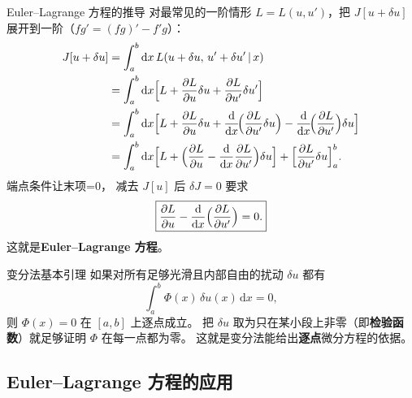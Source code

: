 \documentclass[fontset=windows, chinese, 10pt, xcolor=dvipsnames]{beamer}
\begin{document}
\begin{frame}{Euler--Lagrange 方程的推导}
  对最常见的一阶情形 $L=L(u,u')$，把 $J[u+\delta u]$ 展开到一阶（$fg'=(fg)'-f'g$）：
  \begin{align*}
    J[u+\delta u] &= \int_a^b \mathrm{d}x\, L(u+\delta u,\, u'+\delta u'\,|\,x) \\
    &= \int_a^b \mathrm{d}x \Bigl[L + \frac{\partial L}{\partial u}\delta u
                                  + \frac{\partial L}{\partial u'}\delta u'\Bigr] \\
    &= \int_a^b \mathrm{d}x \Bigl[L + \frac{\partial L}{\partial u}\delta u
       + \frac{\mathrm{d}}{\mathrm{d}x}\!\Bigl(\frac{\partial L}{\partial u'}\delta u\Bigr)
       - \frac{\mathrm{d}}{\mathrm{d}x}\!\Bigl(\frac{\partial L}{\partial u'}\Bigr)\delta u\Bigr] \\
    &= \int_a^b \mathrm{d}x \Bigl[L + \Bigl(\frac{\partial L}{\partial u}
            - \frac{\mathrm{d}}{\mathrm{d}x}\frac{\partial L}{\partial u'}\Bigr)\delta u\Bigr]
       + \Bigl[\frac{\partial L}{\partial u'}\delta u\Bigr]_a^b.
  \end{align*}
  端点条件让末项=0，
  减去 $J[u]$ 后 $\delta J = 0$ 要求
  \begin{equation*}
    \boxed{\frac{\partial L}{\partial u}
    - \frac{\mathrm{d}}{\mathrm{d}x}
      \Bigl(\frac{\partial L}{\partial u'}\Bigr) = 0.}
  \end{equation*}
  这就是\textbf{Euler--Lagrange 方程}。
\end{frame}

\begin{frame}{变分法基本引理}
  如果对所有足够光滑且内部自由的扰动 $\delta u$ 都有
  \begin{equation*}
    \int_a^b \Phi(x)\,\delta u(x)\,\mathrm{d}x = 0,
  \end{equation*}
  则 $\Phi(x)=0$ 在 $[a,b]$ 上逐点成立。
  把 $\delta u$ 取为只在某小段上非零（即\textbf{检验函数}）就足够证明 $\Phi$ 在每一点都为零。
  这就是变分法能给出\textbf{逐点}微分方程的依据。
\end{frame}

\subsection{Euler--Lagrange 方程的应用}
\end{document}
